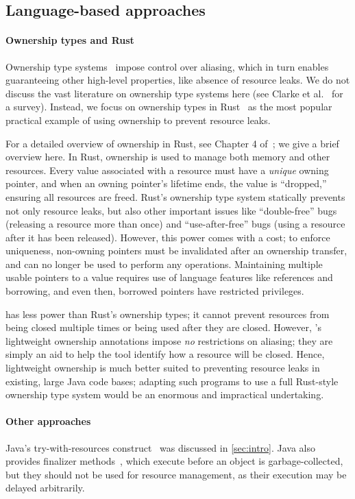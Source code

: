 \subsection{Language-based approaches}\label{sec:rw-language}

\paragraph{Ownership types and Rust} Ownership type
systems~\cite{clarke2013ownership} impose control over aliasing, which
in turn enables guaranteeing other high-level properties, like absence of
resource leaks.  We do not discuss the vast literature on ownership type systems
here (see Clarke et al.~\cite{clarke2013ownership} for a survey). Instead, we
focus on ownership types in Rust~\cite{klabnik2018rust} as the most popular
practical example of using ownership to prevent resource leaks.

For a detailed overview of ownership in Rust, see Chapter 4
of~\cite{klabnik2018rust}; we give a brief overview here.  In Rust, ownership is
used to manage both memory and other resources.  Every value associated with a
resource must have a \emph{unique} owning pointer, and when an owning pointer's
lifetime ends, the value is ``dropped,'' ensuring all resources are freed.
Rust's ownership type system statically prevents
not only resource leaks, but also other important issues like ``double-free'' bugs
(releasing a resource more than once) and ``use-after-free'' bugs (using a
resource after it has been released). However, this power comes with a cost; to
enforce uniqueness, non-owning pointers must be invalidated after an ownership transfer,
and can no longer be used to perform any operations.  Maintaining multiple
usable pointers to a value requires use of language features like references and
borrowing, and even then, borrowed pointers have restricted privileges.

\Tool has less power than Rust's ownership types; it cannot prevent resources
from being closed multiple times or being used after they are closed.  However,
\Tool's lightweight ownership annotations impose \emph{no} restrictions on
aliasing; they are simply an aid to help the tool identify how a resource will
be closed.  Hence, lightweight ownership is much better suited to preventing
resource leaks in existing, large Java code bases; adapting such programs to use
a full Rust-style ownership type system would be an enormous and impractical
undertaking.

\paragraph{Other approaches} Java's try-with-resources
construct~\cite{try-with-resources} was discussed in \cref{sec:intro}.  Java
also provides finalizer methods~\cite[Chapter 12]{gosling2014jls}, which execute before an object is
garbage-collected, but they should not be used for resource management, as their
execution may be delayed arbitrarily.

